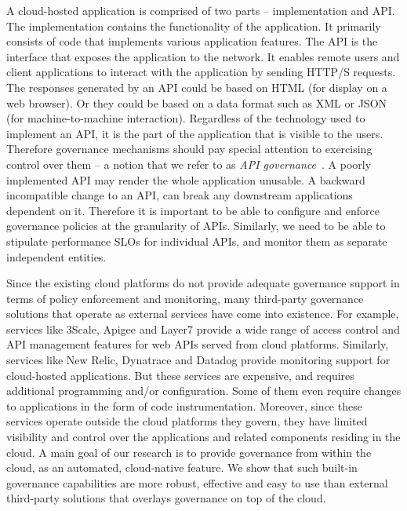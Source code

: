 A cloud-hosted application is comprised of two parts -- implementation and API. The implementation
contains the functionality of the application. It primarily consists of code that implements
various application features. The API is the interface that exposes the application to the
network. It enables remote users and client applications to interact with the application by sending
HTTP/S requests. The responses generated by an API could be based on HTML (for display on a web
browser). Or they could be based on a data format such as XML or JSON (for machine-to-machine 
interaction). Regardless of the technology used to implement an API, it is the part of the application 
that is visible to the users. Therefore governance
mechanisms should pay special attention to exercising control over them -- a notion that we refer
to as \textit{API governance}~\cite{6903538}. A poorly implemented API may render the whole application unusable.
A backward incompatible change to an API, can break any downstream applications dependent on it. 
Therefore it is important to be able to configure and enforce governance policies at the granularity of
APIs. Similarly, we need to be able to stipulate performance SLOs for individual APIs, and monitor
them as separate independent entities.

Since the existing cloud platforms do not provide adequate governance support in terms of policy
enforcement and monitoring, many third-party governance solutions that operate as external services
have come into existence. For example, services like 3Scale, Apigee and Layer7 provide a wide range
of access control and API management features for web APIs served from cloud platforms. Similarly, 
services like New Relic, Dynatrace and Datadog provide monitoring support for cloud-hosted 
applications. But these services are expensive, and requires additional programming and/or configuration.
Some of them even require changes to applications in the form of code instrumentation. Moreover,
since these services operate outside the cloud platforms they govern, they have limited visibility and control
over the applications and related components residing in the cloud. A main goal of our research is to provide governance
from within the cloud, as an automated, cloud-native feature. We show that such built-in governance capabilities are
more robust, effective and easy to use than external third-party solutions that overlays governance on top of the
cloud. 